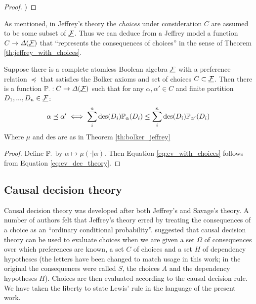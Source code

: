 \begin{proof}
\citet{bolker_functions_1966})
\end{proof}

As mentioned, in Jeffrey's theory the \emph{choices} under consideration $C$ are assumed to be some subset of $\underline{\mathcal{F}}$. Thus we can deduce from a Jeffrey model a function $C\to \Delta(\underline{\mathcal{F}})$ that ``represents the consequences of choices'' in the sense of Theorem \ref{th:jeffrey_with_choices}.

\begin{theorem}\label{th:jeffrey_with_choices}
Suppose there is a complete atomless Boolean algebra $\underline{\mathcal{F}}$ with a preference relation $\preceq$ that satisfies the Bolker axioms and set of choices $C \subset \underline{\mathcal{F}}$. Then there is a function $\mathbb{P}_\cdot:C\to \Delta(\underline{\mathcal{F}})$ such that for any $\alpha,\alpha'\in C$ and finite partition $D_1,...,D_n\in \underline{\mathcal{F}}$:
\begin{align}
    \alpha \preceq \alpha'\iff \sum_{i}^n \text{des}(D_i) \mathbb{P}_\alpha(D_i) \leq \sum_{i}^n \text{des}(D_i) \mathbb{P}_{\alpha'}(D_i)\label{eq:ev_with_choices}
\end{align}
Where $\mu$ and $\mathrm{des}$ are as in Theorem \ref{th:bolker_jeffrey}
\end{theorem}

\begin{proof}
Define $\mathbb{P}_\cdot$ by $\alpha\mapsto \mu(\cdot|\alpha)$. Then Equation \eqref{eq:ev_with_choices} follows from Equation \eqref{eq:ev_dec_theory}.
\end{proof}

\subsection{Causal decision theory}

Causal decision theory was developed after both Jeffrey's and Savage's theory. A number of authors \citet{lewis_causal_1981,skyrms_causal_1982} felt that Jeffrey's theory erred by treating the consequences of a choice as an ``ordinary conditional probability''. \citet{lewis_causal_1981} suggested that causal decision theory can be used to evaluate choices when we are given a set $\Omega$ of consequences over which preferences are known, a set $C$ of choices and a set $H$ of dependency hypotheses (the letters have been changed to match usage in this work; in the original the consequences were called $S$, the choices $A$ and the dependency hypotheses $H$). Choices are then evaluated according to the causal decision rule. We have taken the liberty to state Lewis' rule in the language of the present work.

